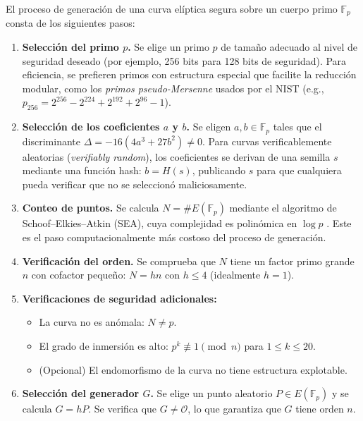 El proceso de generación de una curva elíptica segura sobre un cuerpo primo $\mathbb{F}_p$ consta de los siguientes pasos:

\begin{enumerate}
    \item \textbf{Selección del primo $p$.} Se elige un primo $p$ de tamaño adecuado al nivel de seguridad deseado (por ejemplo, 256 bits para 128 bits de seguridad). Para eficiencia, se prefieren primos con estructura especial que facilite la reducción modular, como los \emph{primos pseudo-Mersenne} usados por el NIST (e.g., $p_{256} = 2^{256} - 2^{224} + 2^{192} + 2^{96} - 1$).
    
    \item \textbf{Selección de los coeficientes $a$ y $b$.} Se eligen $a, b \in \mathbb{F}_p$ tales que el discriminante $\Delta = -16(4a^3 + 27b^2) \neq 0$. Para curvas verificablemente aleatorias (\textit{verifiably random}), los coeficientes se derivan de una semilla $s$ mediante una función hash: $b = H(s)$, publicando $s$ para que cualquiera pueda verificar que no se seleccionó maliciosamente.
    
    \item \textbf{Conteo de puntos.} Se calcula $N = \#E(\mathbb{F}_p)$ mediante el algoritmo de Schoof--Elkies--Atkin (SEA), cuya complejidad es polinómica en $\log p$ \cite{schoof1985elliptic}. Este es el paso computacionalmente más costoso del proceso de generación.
    
    \item \textbf{Verificación del orden.} Se comprueba que $N$ tiene un factor primo grande $n$ con cofactor pequeño: $N = hn$ con $h \leq 4$ (idealmente $h = 1$).
    
    \item \textbf{Verificaciones de seguridad adicionales:}
    \begin{itemize}
        \item La curva no es anómala: $N \neq p$.
        \item El grado de inmersión es alto: $p^k \not\equiv 1 \pmod{n}$ para $1 \leq k \leq 20$.
        \item (Opcional) El endomorfismo de la curva no tiene estructura explotable.
    \end{itemize}
    
    \item \textbf{Selección del generador $G$.} Se elige un punto aleatorio $P \in E(\mathbb{F}_p)$ y se calcula $G = hP$. Se verifica que $G \neq \mathcal{O}$, lo que garantiza que $G$ tiene orden $n$.
\end{enumerate}

